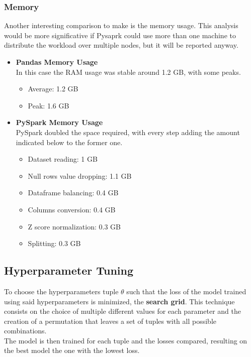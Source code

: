 \documentclass[
	letterpaper, %
	10pt, %
]{class}
\begin{document}
\subsubsection{Memory}

Another interesting comparison to make is the memory usage. This analysis would be more significative if Pysaprk could use more than one machine to distribute the workload over multiple nodes, but it will be reported anyway.\\

\begin{itemize}
    \item \textbf{Pandas Memory Usage}\\
          In this case the RAM usage was stable around 1.2 GB, with some peaks.
          \begin{itemize}
              \item Average: 1.2 GB
              \item Peak: 1.6 GB
          \end{itemize}
    \item \textbf{PySpark Memory Usage}\\
          PySpark doubled the space required, with every step adding the amount indicated below to the former one.
          \begin{itemize}
              \item Dataset reading: 1 GB
              \item Null rows value dropping: 1.1 GB
              \item Dataframe balancing: 0.4 GB
              \item Columns conversion: 0.4 GB
              \item Z score normalization: 0.3 GB
              \item Splitting: 0.3 GB
          \end{itemize}
\end{itemize}


\subsection{Hyperparameter Tuning}
To choose the hyperparameters tuple $\theta$ such that the loss of the model trained using said hyperparameters is minimized, the \textbf{search grid}.
This technique consists on the choice of multiple different values for each parameter and the creation of a permutation that leaves a set of tuples with all possible combinations.\\
The model is then trained for each tuple and the losses compared, resulting on the best model the one with the lowest loss.
\end{document}
